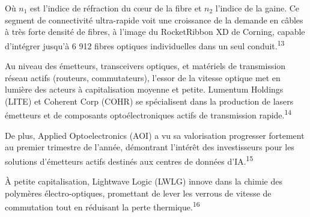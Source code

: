 \documentclass[11pt,a4paper]{article}
\begin{document}
Où $n_1$ est l'indice de réfraction du cœur de la fibre et $n_2$ l'indice de la gaine. Ce segment de connectivité ultra-rapide voit une croissance de la demande en câbles à très forte densité de fibres, à l'image du RocketRibbon XD de Corning, capable d'intégrer jusqu'à 6 912 fibres optiques individuelles dans un seul conduit.\textsuperscript{13}

Au niveau des émetteurs, transceivers optiques, et matériels de transmission réseau actifs (routeurs, commutateurs), l'essor de la vitesse optique met en lumière des acteurs à capitalisation moyenne et petite. Lumentum Holdings (LITE) et Coherent Corp (COHR) se spécialisent dans la production de lasers émetteurs et de composants optoélectroniques actifs de transmission rapide.\textsuperscript{14}

De plus, Applied Optoelectronics (AOI) a vu sa valorisation progresser fortement au premier trimestre de l'année, démontrant l'intérêt des investisseurs pour les solutions d'émetteurs actifs destinés aux centres de données d'IA.\textsuperscript{15}

À petite capitalisation, Lightwave Logic (LWLG) innove dans la chimie des polymères électro-optiques, promettant de lever les verrous de vitesse de commutation tout en réduisant la perte thermique.\textsuperscript{16}
\end{document}

